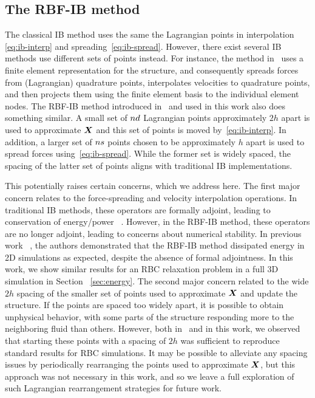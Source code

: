\subsection{The RBF-IB method}\label{sec:rbfib}

The classical IB method uses the same the Lagrangian points in interpolation~%
\eqref{eq:ib-interp} and spreading~\eqref{eq:ib-spread}. However, there exist several IB
methods use different sets of points instead. For instance, the method in~%
\cite{Griffith:2017id} uses a finite element representation for the structure, and
consequently spreads forces from (Lagrangian) quadrature points, interpolates velocities
to quadrature points, and then projects them using the finite element basis to the
individual element nodes. The RBF-IB method introduced in~\cite{Shankar:2015km} and used
in this work also does something similar. A small set of $\data\cardinality$ Lagrangian
points approximately $2h$ apart is used to approximate $\boldsymbol{X}$ and this set of points is
moved by~\eqref{eq:ib-interp}. In addition, a larger set of $\sample\cardinality$ points
chosen to be approximately $h$ apart is used to spread forces using~\eqref{eq:ib-spread}.
While the former set is widely spaced, the spacing of the latter set of points aligns
with traditional IB implementations.

This potentially raises certain concerns, which we address here. The first major concern
relates to the force-spreading and velocity interpolation operations. In traditional IB
methods, these operators are formally adjoint, leading to conservation of energy/power~%
\cite{Peskin:2002go}. However, in the RBF-IB method, these operators are no longer
adjoint, leading to concerns about numerical stability. In previous work~%
\cite{Shankar:2015km}, the authors demonstrated that the RBF-IB method dissipated energy
in 2D simulations as expected, despite the absence of formal adjointness. In this work,
we show similar results for an RBC relaxation problem in a full 3D simulation in Section%
~\ref{sec:energy}. The second major concern related to the wide $2h$ spacing of the
smaller set of points used to approximate $\boldsymbol{X}$ and update the structure. If the points
are spaced too widely apart, it is possible to obtain unphysical behavior, with some
parts of the structure responding more to the neighboring fluid than others.  However,
both in~\cite{Shankar:2015km} and in this work, we observed that starting these points
with a spacing of $2h$ was sufficient to reproduce standard results for RBC simulations.
It may be possible to alleviate any spacing issues by periodically rearranging the points
used to approximate $\boldsymbol{X}$, but this approach was not necessary in this work, and so we
leave a full exploration of such Lagrangian rearrangement strategies for future work.
